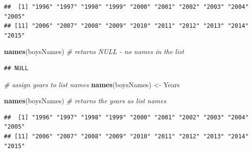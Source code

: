 \documentclass[]{book}
\newenvironment{Shaded}{\begin{snugshade}}{\end{snugshade}}
\newcommand{\CommentTok}[1]{\textcolor[rgb]{0.56,0.35,0.01}{\textit{#1}}}
\newcommand{\KeywordTok}[1]{\textcolor[rgb]{0.13,0.29,0.53}{\textbf{#1}}}
\newcommand{\NormalTok}[1]{#1}
\newcommand{\OperatorTok}[1]{\textcolor[rgb]{0.81,0.36,0.00}{\textbf{#1}}}
\newcommand{\StringTok}[1]{\textcolor[rgb]{0.31,0.60,0.02}{#1}}
\begin{document}
\begin{verbatim}
##  [1] "1996" "1997" "1998" "1999" "2000" "2001" "2002" "2003" "2004" "2005"
## [11] "2006" "2007" "2008" "2009" "2010" "2011" "2012" "2013" "2014" "2015"
\end{verbatim}

\begin{Shaded}
\begin{Highlighting}[]
\KeywordTok{names}\NormalTok{(boysNames) }\CommentTok{# returns NULL - no names in the list}
\end{Highlighting}
\end{Shaded}

\begin{verbatim}
## NULL
\end{verbatim}

\begin{Shaded}
\begin{Highlighting}[]
\CommentTok{# assign years to list names}
\KeywordTok{names}\NormalTok{(boysNames) <-}\StringTok{ }\NormalTok{Years }

\KeywordTok{names}\NormalTok{(boysNames) }\CommentTok{# returns the years as list names}
\end{Highlighting}
\end{Shaded}

\begin{verbatim}
##  [1] "1996" "1997" "1998" "1999" "2000" "2001" "2002" "2003" "2004" "2005"
## [11] "2006" "2007" "2008" "2009" "2010" "2011" "2012" "2013" "2014" "2015"
\end{verbatim}

\begin{Shaded}
\end{Shaded}
\end{document}
